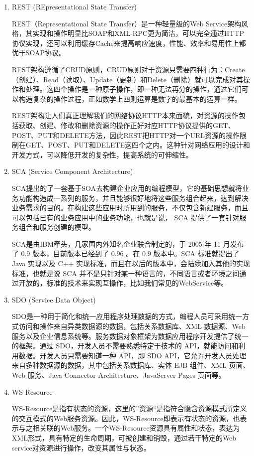 \documentclass[11pt,a4paper]{article}
\begin{document}
\begin{CJK}{UTF8}{gbsn}
\begin{enumerate}
\item REST (REpresentational State Transfer)

    REST（Representational State Transfer）是一种轻量级的Web Service架构风格，其实现和操作明显比SOAP和XML-RPC更为简洁，可以完全通过HTTP协议实现，还可以利用缓存Cache来提高响应速度，性能、效率和易用性上都优于SOAP协议。

    REST架构遵循了CRUD原则，CRUD原则对于资源只需要四种行为：Create（创建）、Read（读取）、Update（更新）和Delete（删除）就可以完成对其操作和处理。这四个操作是一种原子操作，即一种无法再分的操作，通过它们可以构造复杂的操作过程，正如数学上四则运算是数字的最基本的运算一样。

    REST架构让人们真正理解我们的网络协议HTTP本来面貌，对资源的操作包括获取、创建、修改和删除资源的操作正好对应HTTP协议提供的GET、POST、PUT和DELETE方法，因此REST把HTTP对一个URL资源的操作限制在GET、POST、PUT和DELETE这四个之内。这种针对网络应用的设计和开发方式，可以降低开发的复杂性，提高系统的可伸缩性。
　　
\item SCA (Service Component Architecture)

    SCA提出的了一套基于SOA去构建企业应用的编程模型，它的基础思想就将业务功能构造成一系列的服务，并且能够很好地将这些服务组合起来，达到解决业务需求的目的。在构建这些应用时所用到的服务，不仅包含新建服务，而且可以包括已有的业务应用中的业务功能，也就是说， SCA 提供了一套针对服务组合和服务创建的模型。

    SCA是由IBM牵头，几家国内外知名企业联合制定的，于 2005 年 11 月发布了 0.9 版本，目前版本已经到了 0.96 。在 0.9 版本中。SCA 标准就提出了 Java 实现以及 C++ 实现标准，而且在以后的版本中，会陆续加入其他的实现标准，也就是说 SCA 并不是只针对某一种语言的，不同语言或者环境之间通过开放的，标准的技术来实现互操作，比如我们常见的WebService等。
    
\item SDO (Service Data Object)

    SDO是一种用于简化和统一应用程序处理数据的方式，编程人员可采用统一方式访问和操作来自异类数据源的数据，包括关系数据库、XML 数据源、Web 服务以及企业信息系统等。服务数据对象框架为数据应用程序开发提供了统一的框架。通过 SDO，开发人员不需要熟悉特定于技术的 API，就能访问和利用数据。开发人员只需要知道一种 API，即 SDO API，它允许开发人员处理来自多种数据源的数据，其中包括关系数据库、实体 EJB 组件、XML 页面、Web 服务、Java Connector Architecture、JavaServer Pages 页面等。
　
\item WS-Resource

    WS-Resource是指有状态的资源，这里的”资源“是指符合隐含资源模式所定义的交互模式的Web服务资源。因此，WS-Resource即表示有状态的资源，也表示与之相关联的Web服务。一个WS-Resource资源具有属性和状态，表达为XML形式，具有特定的生命周期，可被创建和销毁，通过若干特定的Web service对资源进行操作，改变其属性与状态。
\end{enumerate}



\end{CJK}
\end{document}

